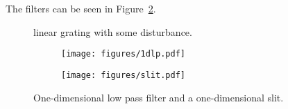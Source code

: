 \documentclass[12pt,a4paper]{article}
\begin{document}
The filters can be seen in Figure~\ref{fig:filters2}.
\begin{figure}
  \centering
  \noindent\makebox[\textwidth]{\scalebox{0.70}{}}
  \caption{linear grating with some disturbance.}
  \label{fig:disturbance}
\end{figure}
\begin{figure}
  \centering
  \begin{subfigure}[b]{0.45\textwidth}
    \texttt{[image: figures/1dlp.pdf]}
  \end{subfigure}
  \begin{subfigure}[b]{0.45\textwidth}
    \texttt{[image: figures/slit.pdf]}
  \end{subfigure}
  \caption{One-dimensional low pass filter and a one-dimensional slit.}
  \label{fig:filters2}
\end{figure}
\end{document}
